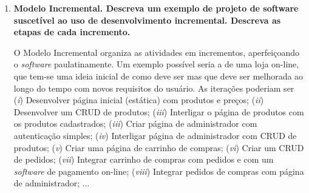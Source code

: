 \documentclass[12pt, a4paper]{article}
\newcommand{\tit}[1]{\textit{#1}}
\newcommand{\tb}[1]{\textbf{#1}}
\newcommand{\iitem}[1]{(\tit{#1})}
\newcommand{\ssw}{\tit{software} }
\newcommand{\question}[1]{\item \tb{#1}}
\newcommand{\answer}[1]{\par #1}
\begin{document}
\begin{enumerate}[label=\textbf{\arabic*.}]
        \question{Modelo Incremental. Descreva um exemplo de projeto de software suscetível ao uso de desenvolvimento incremental. Descreva as etapas de cada incremento.}
        \answer{
            O Modelo Incremental organiza as atividades em incrementos, aperfeiçoando o \ssw paulatinamente. Um exemplo possível seria a de uma loja on-line, que tem-se uma ideia inicial de como deve ser mas que deve ser melhorada ao longo do tempo com novos requisitos do usuário. As iterações poderiam ser \iitem{i} Desenvolver página inicial (estática) com produtos e preços; \iitem{ii} Desenvolver um CRUD de produtos; \iitem{iii} Interligar o página de produtos com os produtos cadastrados; \iitem{iii} Criar página de administrador com autenticação simples; \iitem{iv} Interligar página de administrador com CRUD de produtos; \iitem{v} Criar uma página de carrinho de compras; \iitem{vi} Criar um CRUD de pedidos; \iitem{vii} Integrar carrinho de compras com pedidos e com um \ssw de pagamento on-line; \iitem{viii} Integrar pedidos de compras com página de administrador; ...
        }
        \\
        

\end{enumerate}
\end{document}
